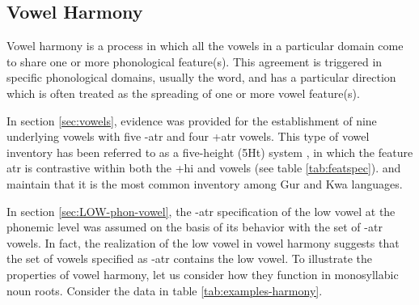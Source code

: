 \subsection{Vowel Harmony}
\label{sec:vowel-harmony}

Vowel harmony is a process in  which all the vowels in a particular domain come
to share one or more phonological feature(s).   This agreement  is
triggered in specific phonological domains, usually the word, and  has a
particular direction which is often treated as the spreading of one or more
vowel feature(s). 

In section \ref{sec:vowels},  evidence was provided for the establishment of
nine
underlying vowels with five {\sc -atr} and four  {\sc +atr} vowels. This
type of  vowel inventory has been referred to as  a five-height (5Ht) system 
\citep[308]{Casa03},  in which the
feature {\sc atr} is contrastive within both the {\sc +hi} and {\sc [-hi,
-lo]} vowels (see table \ref{tab:featspec}).  \citet[81-82]{Daku97} and
\citet[312]{Casa03} maintain that it is the most common inventory among
Gur and Kwa languages. 


In section \ref{sec:LOW-phon-vowel},  the
{\sc -atr} specification of the low vowel at the phonemic level was assumed
  on the basis of its behavior with the set of {\sc -atr} vowels. In
fact, the  realization of the low vowel in vowel harmony suggests that the set
of vowels specified as {\sc -atr}  contains the low vowel. To illustrate
the properties of vowel harmony, let us consider
how they function in  monosyllabic noun roots. Consider the data in
table
\ref{tab:examples-harmony}.



